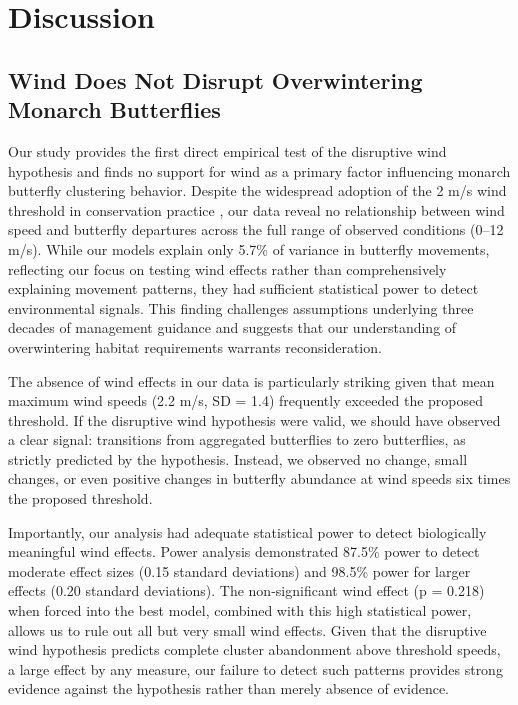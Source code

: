 \section{Discussion}

\subsection{Wind Does Not Disrupt Overwintering Monarch Butterflies}

Our study provides the first direct empirical test of the disruptive wind hypothesis and finds no support for wind as a primary factor influencing monarch butterfly clustering behavior. Despite the widespread adoption of the 2 m/s wind threshold in conservation practice \autocite{xercesGuideWesternMonarch2025}, our data reveal no relationship between wind speed and butterfly departures across the full range of observed conditions (0--12 m/s). While our models explain only 5.7\% of variance in butterfly movements, reflecting our focus on testing wind effects rather than comprehensively explaining movement patterns, they had sufficient statistical power to detect environmental signals. This finding challenges assumptions underlying three decades of management guidance and suggests that our understanding of overwintering habitat requirements warrants reconsideration.

The absence of wind effects in our data is particularly striking given that mean maximum wind speeds (2.2 m/s, SD = 1.4) frequently exceeded the proposed threshold. If the disruptive wind hypothesis were valid, we should have observed a clear signal: transitions from aggregated butterflies to zero butterflies, as strictly predicted by the hypothesis. Instead, we observed no change, small changes, or even positive changes in butterfly abundance at wind speeds six times the proposed threshold. 

Importantly, our analysis had adequate statistical power to detect biologically meaningful wind effects. Power analysis demonstrated 87.5\% power to detect moderate effect sizes (0.15 standard deviations) and 98.5\% power for larger effects (0.20 standard deviations). The non-significant wind effect (p = 0.218) when forced into the best model, combined with this high statistical power, allows us to rule out all but very small wind effects. Given that the disruptive wind hypothesis predicts complete cluster abandonment above threshold speeds, a large effect by any measure, our failure to detect such patterns provides strong evidence against the hypothesis rather than merely absence of evidence.

